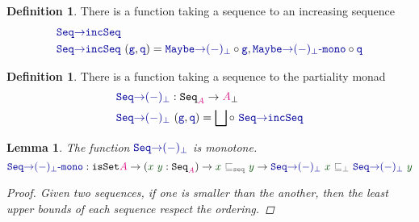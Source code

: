 \documentclass[twoside,11pt,openright]{report}
\theoremstyle{plain} %
\newtheorem{lem}[thm]{Lemma}
\theoremstyle{definition}
\newtheorem{defn}[thm]{Definition}%
\theoremstyle{remark}
\newcommand*{\term}[1]{\textcolor{green!30!black}{#1}} %
\newcommand*{\type}[1]{\textcolor{magenta!90!black}{#1}}
\newcommand*{\relation}[1]{\textcolor{gray!75!black}{\ensuremath{\mathtt{#1}}}}
\newcommand*{\function}[1]{\textcolor{blue!60!black}{\ensuremath{\mathtt{#1}}}}
\newcommand*{\typeformer}[1]{\ensuremath{\mathtt{#1}}}
\begin{document}
\begin{defn}
  There is a function taking a sequence to an increasing sequence 
  \begin{equation}
    \begin{aligned}
      &\function{Seq{\rightarrow}incSeq} \\
      &\function{Seq{\rightarrow}incSeq}~(\function{g} , \function{q}) = \function{Maybe{\rightarrow}(-)_\bot} \circ \function{g} , \function{Maybe{\rightarrow}(-)_\bot\text{-}mono} \circ \function{q}
    \end{aligned}
  \end{equation}
\end{defn}
\begin{defn}
  There is a function taking a sequence to the partiality monad
  \begin{equation}
    \begin{aligned}
      &\function{Seq{\rightarrow}(-)_\bot} : \typeformer{Seq}_{\type{A}} \rightarrow \type{A}_{\bot} \\
      &\function{Seq{\rightarrow}(-)_\bot}~(\function{g},\function{q}) = \bigsqcup \circ~\function{Seq{\rightarrow}incSeq}
    \end{aligned}
  \end{equation}
\end{defn}
\begin{lem}
  The function \(\function{Seq{\rightarrow}(-)_\bot}\) is monotone. 
  \begin{equation}
    \function{Seq{\rightarrow}(-)_\bot\text{-}mono} : \typeformer{isSet} \type{A} \rightarrow (\term{x}~\term{y} : \typeformer{Seq}_{\type{A}}) \rightarrow \term{x}~\relation{\sqsubseteq_{seq}}~\term{y} \rightarrow \function{Seq{\rightarrow}(-)_\bot}~\term{x}~\relation{\sqsubseteq_{\bot}}~\function{Seq{\rightarrow}(-)_\bot}~\term{y}
\end{equation}
  \begin{proof}
    Given two sequences, if one is smaller than the another, then the least upper bounds of each sequence respect the ordering. 
  \end{proof}
\end{lem}
\end{document}
